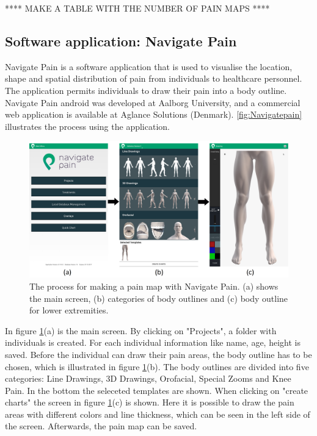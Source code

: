 **** MAKE A TABLE WITH THE NUMBER OF PAIN MAPS ****


\subsection{Software application: Navigate Pain} \label{sec:nav}
Navigate Pain is a software application that is used to visualise the location, shape and spatial distribution of pain from individuals to healthcare personnel. The application permits individuals to draw their pain into a body outline. Navigate Pain android was developed at Aalborg University, and a commercial web application is available at Aglance Solutions (Denmark).\citep{Solutions2015}
\autoref{fig:Navigatepain} illustrates the process using the application.

\begin{figure} [H]
\centering
\includegraphics[width=1\textwidth]{figures/Navigatepain}
\caption{The process for making a pain map with Navigate Pain. (a) shows the main screen, (b) categories of body outlines and (c) body outline for lower extremities.}
\label{fig:Navigatepain}
\end{figure}

\noindent
In figure \ref{fig:Navigatepain}(a) is the main screen. By clicking on "Projects", a folder with individuals is created. For each individual information like name, age, height is saved. Before the individual can draw their pain areas, the body outline has to be chosen, which is illustrated in figure \ref{fig:Navigatepain}(b). The body outlines are divided into five categories: Line Drawings, 3D Drawings, Orofacial, Special Zooms and Knee Pain. In the bottom the seleceted templates are shown. When clicking on "create charts" the screen in figure \ref{fig:Navigatepain}(c) is shown. Here it is possible to draw the pain areas with different colors and line thickness, which can be seen in the left side of the screen. Afterwards, the pain map can be saved.


